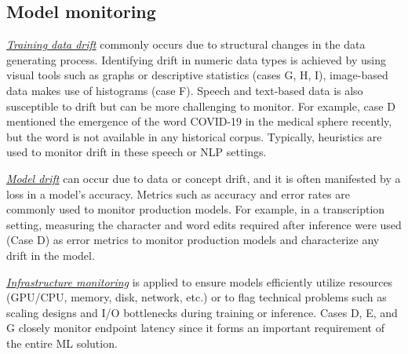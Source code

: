 

\subsection{Model monitoring} 

\underline{\emph{Training data drift}} commonly occurs due to structural changes in the data generating process. Identifying drift in numeric data types is \DIFdelbegin {}\DIFdelend achieved by using visual tools such as graphs or descriptive statistics (cases G, H, I), image-based data makes use of histograms (case F). Speech and text-based data is also susceptible to drift but can be more challenging to monitor. For example, case D mentioned the emergence of the word COVID-19 in the medical sphere recently, but the word is not available in any historical corpus. Typically, heuristics are used to monitor drift in these speech or NLP settings.

\underline{\emph{Model drift}} can occur due to data or concept drift, and it is often manifested by a loss in a model's accuracy. Metrics such as accuracy and error rates are commonly used to monitor production models. For example, in a transcription setting, measuring the character and word edits required after inference were used (Case D) as error metrics to monitor production models and characterize any drift in the model.

\underline{\emph{Infrastructure monitoring}}
is applied to ensure models efficiently utilize resources (GPU/CPU, memory, disk, network, etc.) or to flag technical problems such as scaling designs and I/O bottlenecks during training or inference. Cases D, E, and G closely monitor endpoint latency since it forms an important requirement of the entire ML solution.


